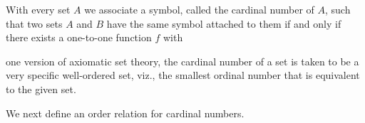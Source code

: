 With every set $A$ we associate a symbol, called the cardinal number of $A$, such that two sets $A$ and $B$ have the same symbol attached to them if and only if there exists a one-to-one function $f$ with

one version of axiomatic set theory, the cardinal number of a set is taken to be a very specific well-ordered set, viz., the smallest ordinal number that is equivalent to the given set.

We next define an order relation for cardinal numbers.